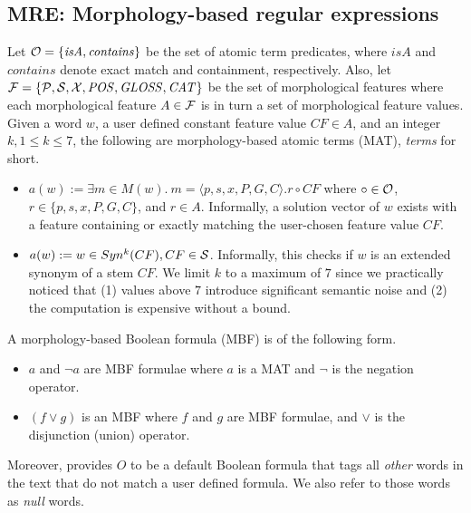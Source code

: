 \vspace{-1em}
\subsection{MRE: Morphology-based regular expressions}
\label{subsec:grammar}

Let ${\cal O} = \{ \mathit{isA}, \mathit{contains}\}$ be the set of atomic term 
predicates, where $\mathit{isA}$ and $\mathit{contains}$ denote exact match and containment, respectively.
Also, let ${\cal F} = \{ \pp, \ss, \xx, \PP, \GG, \AC\}$ be the 
set of morphological features where each morphological feature $A\in {\cal F}$ is in 
turn a set of morphological feature values.
Given a word $w$,
a user defined constant feature value $CF\in A$,
and an integer $k, 1\le k\le 7$, 
the following are morphology-based atomic terms (MAT), {\em terms} for short.
\begin{itemize}
  \item $a(w):= \exists m \in M(w).~m=\langle p,s,x,P,G,C\rangle. r \circ CF$
where $\circ \in {\cal O}$, $r \in \{p,s,x,P,G,C\}$, and $r\in A$.
Informally, a solution vector of $w$ exists with
a feature containing or exactly matching the user-chosen feature value $CF$.
\item $a(w) := w \in Syn^k(CF), CF \in \ss$.
  Informally, this checks if $w$ is an extended synonym of a stem $CF$.
  We limit $k$ to a maximum of $7$ since we practically noticed that 
  (1) values above $7$ introduce significant semantic noise and
  (2) the computation is expensive without a bound.
\end{itemize}

A morphology-based Boolean formula (MBF) is of the following form.
\begin{itemize}
  \item $a$ and $\neg a$ are MBF formulae where $a$ is a MAT and $\neg$ is the negation operator. 
  \item $(f \vee g)$ is an MBF where $f$ and $g$ are MBF formulae, 
    and $\vee$ is the disjunction (union) operator. 
\end{itemize}

Moreover, \framework provides $O$ to be a default Boolean formula that tags all {\em other} words in the text that do not match a user defined formula.
We also refer to those words as {\em null} words.



